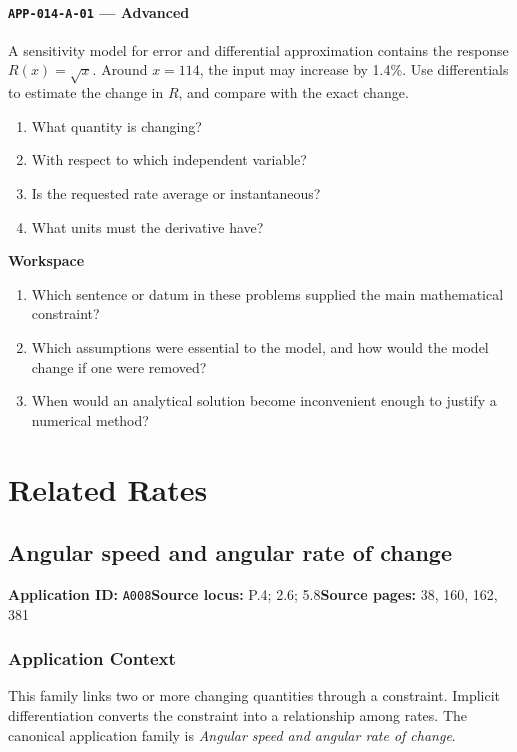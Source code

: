 \documentclass[11pt]{book}
\newcommand{\pid}[1]{\texttt{#1}}
\newcommand{\workspace}{\par\vspace{0.7in}\hrulefill\par\vspace{0.55in}\hrulefill\par}
\begin{document}
\subsection*{\pid{APP-014-A-01} — Advanced}
\begin{problembox}
A sensitivity model for error and differential approximation contains the response $R(x)=\sqrt{x}$. Around $x=114$, the input may increase by 1.4\%. Use differentials to estimate the change in $R$, and compare with the exact change.
\end{problembox}
\begin{promptbox}\begin{enumerate}
\item What quantity is changing?
\item With respect to which independent variable?
\item Is the requested rate average or instantaneous?
\item What units must the derivative have?
\end{enumerate}\end{promptbox}
\textbf{Workspace}\workspace
\begin{reflectionbox}\begin{enumerate}
\item Which sentence or datum in these problems supplied the main mathematical constraint?
\item Which assumptions were essential to the model, and how would the model change if one were removed?
\item When would an analytical solution become inconvenient enough to justify a numerical method?
\end{enumerate}\end{reflectionbox}
\part{Related Rates}
\chapter{Angular speed and angular rate of change}\label{app:A008}
\textbf{Application ID:} \pid{A008}\quad \textbf{Source locus:} P.4; 2.6; 5.8\quad \textbf{Source pages:} 38, 160, 162, 381
\section*{Application Context}
This family links two or more changing quantities through a constraint. Implicit differentiation converts the constraint into a relationship among rates. The canonical application family is \emph{Angular speed and angular rate of change}.
\end{document}
